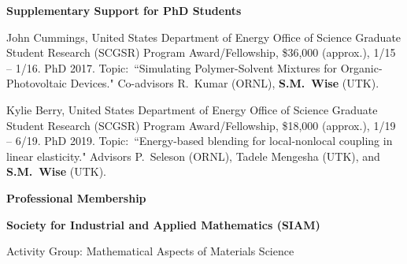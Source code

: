 \documentclass[11pt]{letter}
\begin{document}
	\smallskip
	
{\LARGE\bf Supplementary Support for PhD Students}
    \begin{description}
    \item
John Cummings, United States Department of Energy Office of Science Graduate Student Research (SCGSR) Program Award/Fellowship, \$36,000 (approx.), 1/15 -- 1/16. PhD 2017.  Topic:~``Simulating Polymer-Solvent Mixtures for Organic-Photovoltaic Devices." Co-advisors R.~Kumar (ORNL), \textbf{S.M.~Wise} (UTK).
    \item
Kylie Berry, United States Department of Energy Office of Science Graduate Student Research (SCGSR) Program Award/Fellowship, \$18,000 (approx.), 1/19 -- 6/19. PhD 2019.  Topic:~``Energy-based blending for local-nonlocal coupling in linear elasticity." Advisors P.~Seleson (ORNL), Tadele Mengesha (UTK), and \textbf{S.M.~Wise} (UTK).
	\end{description}
  
{\LARGE\bf  Professional Membership}
    \begin{description}
    \item
 \textbf{Society for Industrial and Applied Mathematics (SIAM)}
    \begin{description}
    \item
Activity Group: Mathematical Aspects of Materials Science
    \end{description}
    \end{description}
	
	\smallskip
\end{document}
